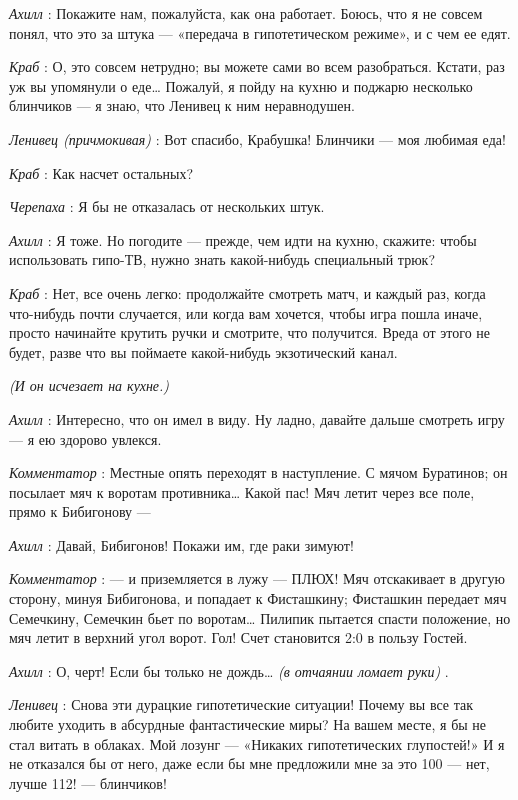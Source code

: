 \emph{Ахилл} : Покажите нам, пожалуйста, как она работает. Боюсь, что я не совсем понял, что это за штука --- «передача в гипотетическом режиме», и с чем ее едят.

\emph{Краб} : О, это совсем нетрудно; вы можете сами во всем разобраться. Кстати, раз уж вы упомянули о еде\ldots{} Пожалуй, я пойду на кухню и поджарю несколько блинчиков --- я знаю, что Ленивец к ним неравнодушен.

\emph{Ленивец (причмокивая)} : Вот спасибо, Крабушка! Блинчики --- моя любимая еда!

\emph{Краб} : Как насчет остальных?

\emph{Черепаха} : Я бы не отказалась от нескольких штук.

\emph{Ахилл} : Я тоже. Но погодите --- прежде, чем идти на кухню, скажите: чтобы использовать гипо-ТВ, нужно знать какой-нибудь специальный трюк?

\emph{Краб} : Нет, все очень легко: продолжайте смотреть матч, и каждый раз, когда что-нибудь почти случается, или когда вам хочется, чтобы игра пошла иначе, просто начинайте крутить ручки и смотрите, что получится. Вреда от этого не будет, разве что вы поймаете какой-нибудь экзотический канал.

\emph{(И он исчезает на кухне.)}

\emph{Ахилл} : Интересно, что он имел в виду. Ну ладно, давайте дальше смотреть игру --- я ею здорово увлекся.

\emph{Комментатор} : Местные опять переходят в наступление. С мячом Буратинов; он посылает мяч к воротам противника\ldots{} Какой пас! Мяч летит через все поле, прямо к Бибигонову ---

\emph{Ахилл} : Давай, Бибигонов! Покажи им, где раки зимуют!

\emph{Комментатор} : --- и приземляется в лужу --- ПЛЮХ! Мяч отскакивает в другую сторону, минуя Бибигонова, и попадает к Фисташкину; Фисташкин передает мяч Семечкину, Семечкин бьет по воротам\ldots{} Пилипик пытается спасти положение, но мяч летит в верхний угол ворот. Гол! Счет становится 2:0 в пользу Гостей.

\emph{Ахилл} : О, черт! Если бы только не дождь\ldots{} \emph{(в отчаянии ломает руки)} .

\emph{Ленивец} : Снова эти дурацкие гипотетические ситуации! Почему вы все так любите уходить в абсурдные фантастические миры? На вашем месте, я бы не стал витать в облаках. Мой лозунг --- «Никаких гипотетических глупостей!» И я не отказался бы от него, даже если бы мне предложили мне за это 100 --- нет, лучше 112! --- блинчиков!

